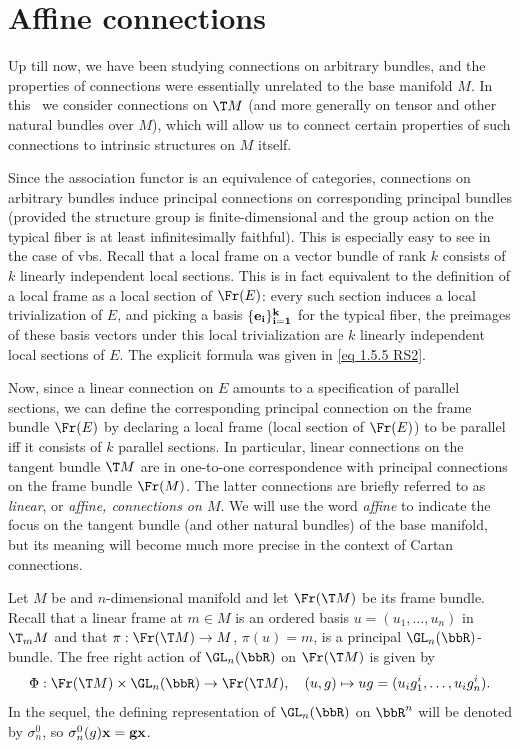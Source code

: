 \section{Affine connections}

Up till now, we have been studying connections on arbitrary bundles, and the properties of connections were essentially unrelated to the base manifold $M$. In this \sect\ we consider connections on $\T M$ (and more generally on tensor and other natural bundles over $M$), which will allow us to connect certain properties of such connections to intrinsic structures on $M$ itself.

Since the association functor is an equivalence of categories, connections on arbitrary bundles induce principal connections on corresponding principal bundles (provided the structure group is finite-dimensional and the group action on the typical fiber is at least infinitesimally faithful). This is especially easy to see in the case of \glspl{vb}. Recall that a local frame on a vector bundle of rank $k$ consists of $k$ linearly independent local sections. This is in fact equivalent to the definition of a local frame as a local section of $\Fr(E)$: every such section induces a local trivialization of $E$, and picking a basis $\{\bf{e}_i\}_{i=1}^k$ for the typical fiber, the preimages of these basis vectors under this local trivialization are $k$ linearly independent local sections of $E$. The explicit formula was given in \eqref{eq 1.5.5 RS2}.

Now, since a linear connection on $E$ amounts to a specification of parallel sections, we can define the corresponding principal connection on the frame bundle $\Fr(E)$ by declaring a local frame (local section of $\Fr(E)$) to be parallel iff it consists of $k$ parallel sections. In particular, linear connections on the tangent bundle $\T M$ are in one-to-one correspondence with principal connections on the frame bundle $\Fr(M)$. The latter connections are briefly referred to as \emph{linear}, or \emph{affine, connections on $M$}. We will use the word \emph{affine} to indicate the focus on the tangent bundle (and other natural bundles) of the base manifold, but its meaning will become much more precise in the context of Cartan connections.

Let $M$ be and $n$-dimensional manifold and let $\Fr(\T M)$ be its frame bundle. Recall that a linear frame at $m\in M$ is an ordered basis $u=(u_1,\ldots,u_n)$ in $\T_m M$ and that $\pi:\Fr(\T M)\to M$, $\pi(u)=m$, is a principal $\GL_n(\bbR)$-bundle. The free right action of $\GL_n(\bbR)$ on $\Fr(\T M)$ is given by
\[\Phi:\Fr(\T M)\times \GL_n(\bbR)\to \Fr(\T M),\quad (u,g)\mapsto ug=(u_ig^i_1,\ldots,u_ig^i_n).\]
In the sequel, the defining representation of $\GL_n(\bbR)$ on $\bbR^n$ will be denoted by $\sigma^0_n$, so $\sigma^0_n(g)\bf{x}=g\bf{x}$.


